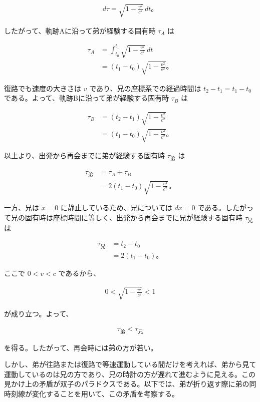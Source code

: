 \documentclass[platex,dvipdfmx,a4paper]{jsarticle}
\begin{document}
\begin{align*}
  d\tau=\sqrt{1-\frac{v^2}{c^2}}\,dt。
\end{align*}

したがって、軌跡Aに沿って弟が経験する固有時 \(\tau_A\) は

\begin{align*}
  \tau_A
    &=\int_{t_0}^{t_1}\sqrt{1-\frac{v^2}{c^2}}\,dt \\
    &=(t_1-t_0)\sqrt{1-\frac{v^2}{c^2}}。
\end{align*}

復路でも速度の大きさは \(v\) であり、兄の座標系での経過時間は \(t_2-t_1=t_1-t_0\) である。よって、軌跡Bに沿って弟が経験する固有時 \(\tau_B\) は

\begin{align*}
  \tau_B
    &=(t_2-t_1)\sqrt{1-\frac{v^2}{c^2}} \\
    &=(t_1-t_0)\sqrt{1-\frac{v^2}{c^2}}。
\end{align*}

以上より、出発から再会までに弟が経験する固有時 \(\tau_{\mathrm{弟}}\) は

\begin{align*}
  \tau_{\mathrm{弟}}
    &=\tau_A+\tau_B \\
    &=2(t_1-t_0)\sqrt{1-\frac{v^2}{c^2}}。
\end{align*}

一方、兄は \(x=0\) に静止しているため、兄については \(dx=0\) である。したがって兄の固有時は座標時間に等しく、出発から再会までに兄が経験する固有時 \(\tau_{\mathrm{兄}}\) は

\begin{align*}
  \tau_{\mathrm{兄}}
    &=t_2-t_0 \\
    &=2(t_1-t_0)。
\end{align*}

ここで \(0<v<c\) であるから、

\begin{align*}
  0<\sqrt{1-\frac{v^2}{c^2}}<1
\end{align*}

が成り立つ。よって、

\begin{align*}
  \tau_{\mathrm{弟}}<\tau_{\mathrm{兄}}
\end{align*}

を得る。したがって、再会時には弟の方が若い。

しかし、弟が往路または復路で等速運動している間だけを考えれば、弟から見て運動しているのは兄の方であり、兄の時計の方が遅れて進むように見える。この見かけ上の矛盾が双子のパラドクスである。以下では、弟が折り返す際に弟の同時刻線が変化することを用いて、この矛盾を考察する。
\end{document}
